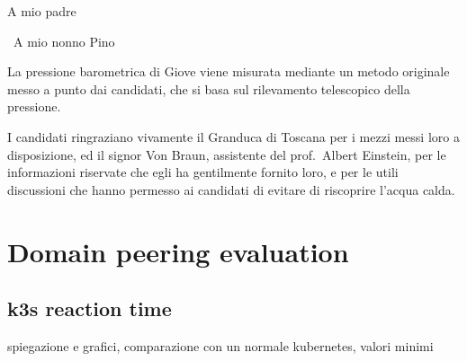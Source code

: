 \documentclass[%
	corpo=11pt,
    twoside,
    stile=classica,
    oldstyle,
    tipotesi=custom,
    greek,
    evenboxes,
]{toptesi}
\begin{document}
\english


\ifclassica%
{\begin{dedica}
    A mio padre

    \textdagger\ A mio nonno Pino
\end{dedica}

\sommario%
La pressione barometrica di Giove viene misurata mediante un metodo originale  messo a punto dai candidati, che si basa sul rilevamento telescopico della pressione.


\ringraziamenti%
I candidati ringraziano vivamente il Granduca di Toscana per i mezzi messi loro a disposizione, ed il signor Von Braun, assistente del prof.~Albert Einstein, per le informazioni riservate che egli ha gentilmente fornito loro, e per le utili discussioni che hanno permesso ai candidati di evitare di riscoprire l'acqua calda.


\tablespagetrue\figurespagetrue%

\indici%


\mainmatter














\chapter{Domain peering evaluation}

\section{k3s reaction time}
spiegazione e grafici, comparazione con un normale kubernetes, valori minimi

}
\end{document}

